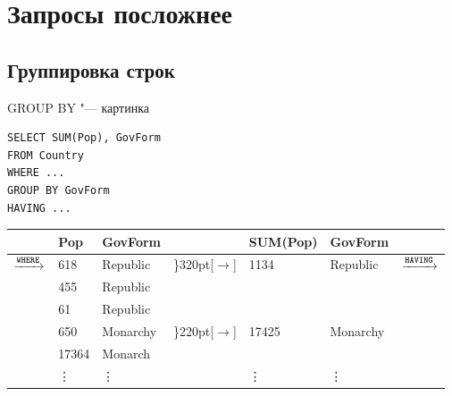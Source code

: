 \section{Запросы посложнее}
\begin{frame}
	\tableofcontents[currentsection]
\end{frame}

\subsection{Группировка строк}

\begin{frame}[fragile]{GROUP BY "--- картинка}
	\begin{center}
		\begin{minipage}{0.4\textwidth}
\begin{verbatim}
SELECT SUM(Pop), GovForm
FROM Country
WHERE ...
GROUP BY GovForm
HAVING ...
\end{verbatim}
		\end{minipage}
\vspace{10pt}

		\begin{tabular}{rllclll}
			\hline
			& Pop & GovForm & & SUM(Pop) & GovForm & \\\hline
			\multirow{6}{*}{$\xrightarrow{\t{WHERE}}$} & 618 & Republic & \rdelim\}{3}{20pt}[$\longrightarrow$] & \multirow{3}{*}{1134} & \multirow{3}{*}{Republic} & \multirow{6}{*}{$\xrightarrow{\t{HAVING}}$}\\
			& 455 & Republic \\
			& 61 & Republic \\
			& 650 & Monarchy & \rdelim\}{2}{20pt}[$\longrightarrow$] & \multirow{2}{*}{17425} & \multirow{2}{*}{Monarchy} & \\
			& 17364 & Monarch \\
			& \vdots & \vdots & & \vdots & \vdots & \\
		\end{tabular}
	\end{center}
\end{frame}

